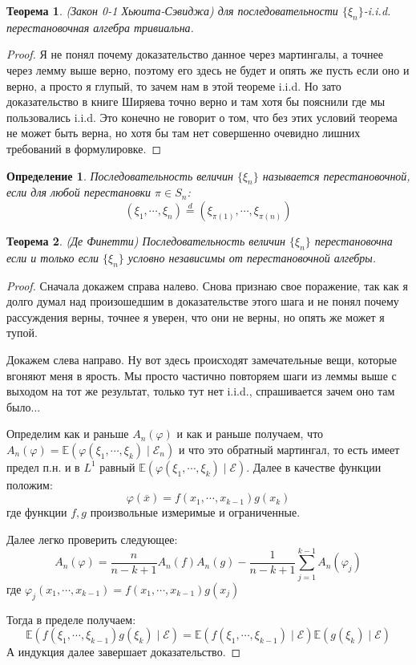 \documentclass[12pt,a4paper]{article} %
\newtheorem{theorem}{Теорема}
\newtheorem{definition}{Определение}
\newcommand{\E}{\mathbb{E}}
\begin{document}
	\begin{theorem}
		(Закон 0-1 Хьюита-Сэвиджа) для последовательности $\{\xi_n\}$-i.i.d. перестановочная алгебра тривиальна.
	\end{theorem}
	\begin{proof}
		Я не понял почему доказательство данное через мартингалы, а точнее через лемму выше верно, поэтому его здесь не будет и опять же пусть если оно и верно, а просто я глупый, то зачем нам в этой теореме i.i.d. Но зато доказательство в книге Ширяева точно верно и там хотя бы пояснили где мы пользовались i.i.d. Это конечно не говорит о том, что без этих условий теорема не может быть верна, но хотя бы там нет совершенно очевидно лишних требований в формулировке.
	\end{proof}
	\begin{definition}
		Последовательность величин $\{\xi_n\}$ называется перестановочной, если для любой перестановки $\pi\in S_n$:
		$$(\xi_1,\cdots,\xi_n)\overset{d}{=}(\xi_{\pi(1)},\cdots,\xi_{\pi(n)})$$
	\end{definition}
	\begin{theorem}
		(Де Финетти) Последовательность величин $\{\xi_n\}$ перестановочна если и только если $\{\xi_n\}$ условно независимы от перестановочной алгебры.
	\end{theorem}
	\begin{proof}
		Сначала докажем справа налево. Снова признаю свое поражение, так как я долго думал над произошедшим в доказательстве этого шага и не понял почему рассуждения верны, точнее я уверен, что они не верны, но опять же может я тупой.
		
		Докажем слева направо. Ну вот здесь происходят замечательные вещи, которые вгоняют меня в ярость. Мы просто частично повторяем шаги из леммы выше с выходом на тот же результат, только тут нет i.i.d., спрашивается зачем оно там было...
		
		Определим как и раньше $A_n(\varphi)$ и как и раньше получаем, что $A_n(\varphi)=\E(\varphi(\xi_1,\cdots,\xi_k)\mid\mathcal{E}_n)$ и что это обратный мартингал, то есть имеет предел п.н. и в $L^1$ равный $\E(\varphi(\xi_1,\cdots,\xi_k)\mid\mathcal{E})$. Далее в качестве функции положим:
		$$\varphi(\overline{x})=f(x_1,\cdots,x_{k-1})g(x_k)$$
		где функции $f,g$ произвольные измеримые и ограниченные.
		
		Далее легко проверить следующее:
		$$A_n(\varphi)=\frac{n}{n-k+1}A_n(f)A_n(g)-\frac{1}{n-k+1}\sum_{j=1}^{k-1}A_n(\varphi_j)$$
		где $\varphi_j(x_1,\cdots,x_{k-1})=f(x_1,\cdots,x_{k-1})g(x_j)$
		
		Тогда в пределе получаем:
		$$\E(f(\xi_1,\cdots,\xi_{k-1})g(\xi_k)\mid\mathcal{E})=\E(f(\xi_1,\cdots,\xi_{k-1})\mid\mathcal{E})\E(g(\xi_k)\mid\mathcal{E})$$
		А индукция далее завершает доказательство.
	\end{proof}
\end{document}
